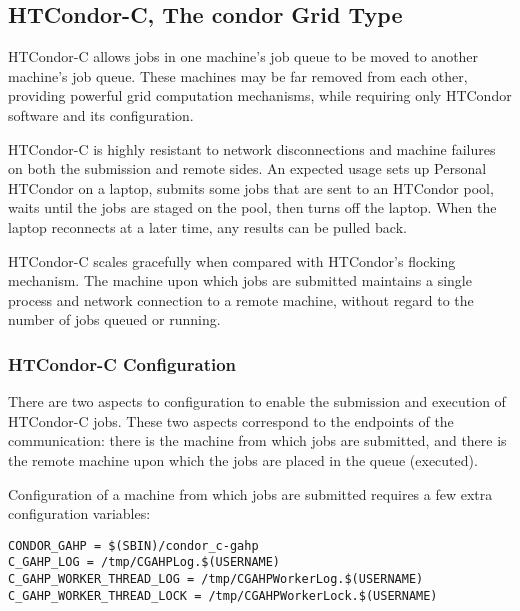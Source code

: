 
\subsection{\label{sec:HTCondor-C}HTCondor-C, The condor Grid Type }

HTCondor-C allows jobs in one machine's job queue to
be moved to another machine's job queue.
These machines may be far removed from each other,
providing powerful grid computation mechanisms,
while requiring only HTCondor software and its configuration.

HTCondor-C is highly resistant to network disconnections and machine failures on both the submission and remote sides.
An expected usage
sets up Personal HTCondor on a laptop,
submits some jobs that are sent to an HTCondor pool,
waits until the jobs are staged on the pool,
then turns off the laptop.
When the laptop reconnects at a later time,
any results can be pulled back.

HTCondor-C scales gracefully when compared with HTCondor's flocking
mechanism.
The machine upon which jobs are submitted
maintains a single process and network connection to a remote machine,
without regard to the number
of jobs queued or running.

\subsubsection{\label{sec:HTCondor-C-Config}HTCondor-C Configuration}
There are two aspects to configuration to enable the
submission and execution of HTCondor-C jobs.
These two aspects correspond to the endpoints of the 
communication: there is the machine from which jobs are
submitted, and there is the remote machine upon which the
jobs are placed in the queue (executed).

Configuration of a machine from which jobs are submitted
requires a few extra configuration variables:

\footnotesize
\begin{verbatim}
CONDOR_GAHP = $(SBIN)/condor_c-gahp
C_GAHP_LOG = /tmp/CGAHPLog.$(USERNAME)
C_GAHP_WORKER_THREAD_LOG = /tmp/CGAHPWorkerLog.$(USERNAME)
C_GAHP_WORKER_THREAD_LOCK = /tmp/CGAHPWorkerLock.$(USERNAME)
\end{verbatim}
\normalsize

